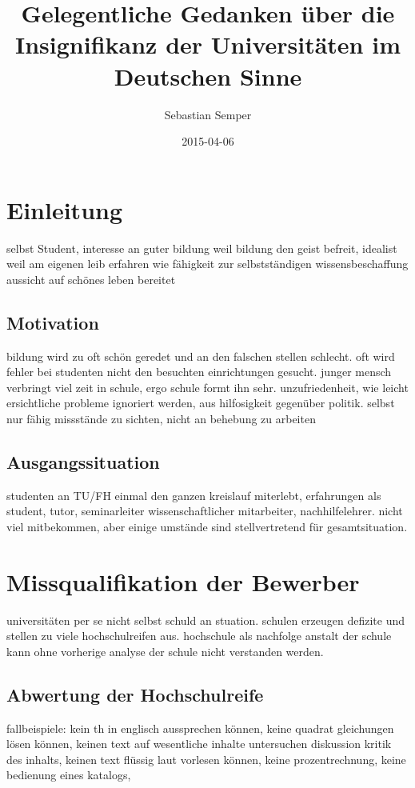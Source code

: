 \documentclass[a4paper,10pt,twoside,titlepage]{article}
\author{Sebastian Semper}
\title{Gelegentliche Gedanken über die Insignifikanz der Universitäten im Deutschen Sinne}
\date{2015-04-06}
\begin{document}
\maketitle

\tableofcontents

\newpage


\section{Einleitung}
selbst Student, interesse an guter bildung weil bildung den geist befreit, idealist weil am eigenen leib erfahren wie fähigkeit zur selbstständigen wissensbeschaffung aussicht auf schönes leben bereitet

\subsection{Motivation}
bildung wird zu oft schön geredet und an den falschen stellen schlecht. oft wird fehler bei studenten nicht den besuchten einrichtungen gesucht. junger mensch verbringt viel zeit in schule, ergo schule formt ihn sehr. unzufriedenheit, wie leicht ersichtliche probleme ignoriert werden, aus hilfosigkeit gegenüber politik. selbst nur fähig missstände zu sichten, nicht an behebung zu arbeiten

\subsection{Ausgangssituation}
studenten an TU/FH einmal den ganzen kreislauf miterlebt, erfahrungen als student, tutor, seminarleiter wissenschaftlicher mitarbeiter, nachhilfelehrer. nicht viel mitbekommen, aber einige umstände sind stellvertretend für gesamtsituation.

\section{Missqualifikation der Bewerber}
universitäten per se nicht selbst schuld an stuation. schulen erzeugen defizite und stellen zu viele hochschulreifen aus. hochschule als nachfolge anstalt der schule kann ohne vorherige analyse der schule nicht verstanden werden.

\subsection{Abwertung der Hochschulreife}
fallbeispiele: kein th in englisch aussprechen können, keine quadrat gleichungen lösen können, keinen text auf wesentliche inhalte untersuchen diskussion kritik des inhalts, keinen text flüssig laut vorlesen können, keine prozentrechnung, keine bedienung eines katalogs,
\end{document}
